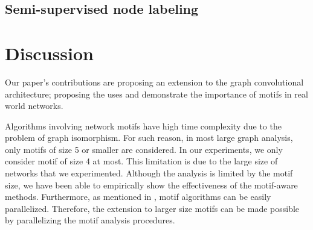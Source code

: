 \documentclass{article}
\theoremstyle{definition}
\begin{document}
\begin{table}[H]
\centering
{}
\caption{F1-macro score for multiclass labeling}
\label{t:re}
\end{table}

\subsection{Semi-supervised node labeling}


\section{Discussion}

Our paper's contributions are proposing an extension to the graph convolutional 
architecture; proposing the uses and demonstrate the importance of motifs in
real world networks.

Algorithms involving network motifs have high time complexity due to
the problem of graph isomorphism. For such reason, in most large graph
analysis, only motifs of size 5 or smaller are considered. In our 
experiments, we only consider motif of size 4 at most. This limitation is 
due to the large size of networks that we experimented. Although the
analysis is limited by the motif size, we have been able to empirically 
show the effectiveness of the motif-aware methods. Furthermore, as 
mentioned in \cite{juremotif}, motif algorithms can be easily 
parallelized. Therefore, the extension to larger size motifs can be made 
possible by parallelizing the motif analysis procedures.



\end{document}
